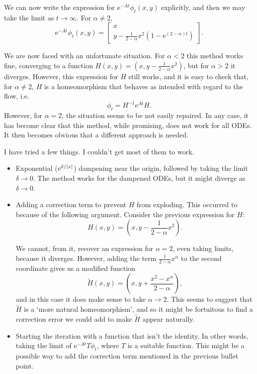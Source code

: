 \documentclass{article}
\newcommand{\e}{\mathrm{e}}
\DeclarePairedDelimiter{\abs}{\lvert}{\rvert}
\begin{document}
We can now write the expression for $\e^{-At} \phi_t (x,y)$ explicitly, and then we may take the limit as $t \to \infty$. For $\alpha \neq 2$,
\begin{equation}\label{flowsimple}
\e^{-At} \phi_t (x,y) =
\begin{bmatrix}
x\\
y - \frac1{2-\alpha} x^2 (1 - \e^{(2-\alpha)t})
\end{bmatrix}.
\end{equation}

We are now faced with an unfortunate situation. For $\alpha < 2$ this method works fine, converging to a function $H(x,y) = (x, y-\frac1{2-\alpha} x^2)$, but for $\alpha > 2$ it diverges. However, this expression for $H$ still works, and it is easy to check that, for $\alpha \neq 2$, $H$ is a homeomorphism that behaves as intended with regard to the flow, i.e.
\[\phi_t = H^{-1} \e^{A t} H.\]
However, for $\alpha = 2$, the situation seems to be not easily repaired. In any case, it has become clear that this method, while promising, does not work for all ODEs. It then becomes obvious that a different approach is needed.

I have tried a few things. I couldn't get most of them to work.
\begin{itemize}
\item Exponential ($\e^{\delta/\abs{x}}$) dampening near the origin, followed by taking the limit $\delta \to 0$. The method works for the dampened ODEs, but it might diverge as $\delta \to 0$.

\item Adding a correction term to prevent $H$ from exploding. This occurred to because of the following argument. Consider the previous expression for $H$:
\[H(x,y) = (x,y - \frac1{2-\alpha} x^2).\]

We cannot, from it, recover an expression for $\alpha = 2$, even taking limits, because it diverges. However, adding the term $\frac1{2-\alpha} x^\alpha$ to the second coordinate gives us a modified function
\[\tilde H(x,y) = (x,y + \frac{x^2 - x^\alpha}{2-\alpha}),\]
and in this case it does make sense to take $\alpha \to 2$. This seems to suggest that $\tilde H$ is a `more natural homeomorphism', and so it might be fortuitous to find a correction error we could add to make $\tilde H$ appear naturally.

\item Starting the iteration with a function that isn't the identity. In other words, taking the limit of $\e^{-A t} T \phi_t$, where $T$ is a suitable function. This might be a possible way to add the correction term mentioned in the previous bullet point.
\end{itemize}
\end{document}
